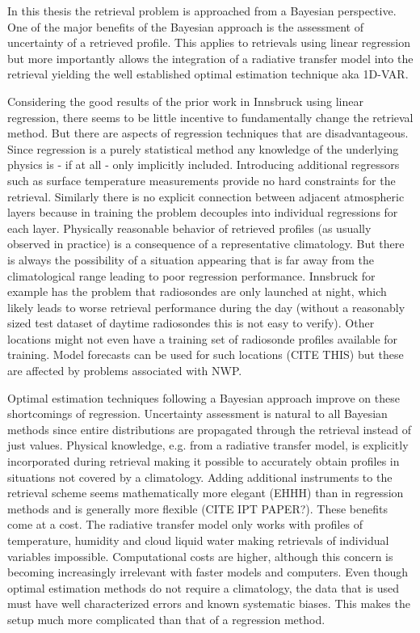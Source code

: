 \stopsection


\startsection[title={Objectives and Outline}]

    In this thesis the retrieval problem is approached from a Bayesian
    perspective. One of the major benefits of the Bayesian approach is the
    assessment of uncertainty of a retrieved profile. This applies to
    retrievals using linear regression but more importantly allows the
    integration of a radiative transfer model into the retrieval yielding
    the well established optimal estimation technique aka 1D-VAR.

    Considering the good results of the prior work in Innsbruck using linear
    regression, there seems to be little incentive to fundamentally change the
    retrieval method. But there are aspects of regression techniques that are
    disadvantageous. Since regression is a purely statistical method any
    knowledge of the underlying physics is - if at all - only implicitly
    included. Introducing additional regressors such as surface temperature
    measurements provide no hard constraints for the retrieval. Similarly
    there is no explicit connection between adjacent atmospheric layers because
    in training the problem decouples into individual regressions for each
    layer. Physically reasonable behavior of retrieved profiles (as usually
    observed in practice) is a consequence of a representative climatology.
    But there is always the possibility of a situation appearing that is far
    away from the climatological range leading to poor regression performance.
    Innsbruck for example has the problem that radiosondes are only launched at
    night, which likely leads to worse retrieval performance during the day
    (without a reasonably sized test dataset of daytime radiosondes this is not
    easy to verify).  Other locations might not even have a training set of
    radiosonde profiles available for training. Model forecasts can be used for
    such locations (CITE THIS) but these are affected by problems associated
    with NWP.

    Optimal estimation techniques following a Bayesian approach improve on
    these shortcomings of regression. Uncertainty assessment is natural to all
    Bayesian methods since entire distributions are propagated through the
    retrieval instead of just values. Physical knowledge, e.g. from a radiative
    transfer model, is explicitly incorporated during retrieval making it
    possible to accurately obtain profiles in situations not covered by
    a climatology. Adding additional instruments to the retrieval scheme seems
    mathematically more elegant (EHHH) than in regression methods and is
    generally more flexible (CITE IPT PAPER?). These benefits come at a cost.
    The radiative transfer model only works with profiles of temperature,
    humidity and cloud liquid water making retrievals of individual variables
    impossible. Computational costs are higher, although this concern is
    becoming increasingly irrelevant with faster models and computers. Even
    though optimal estimation methods do not require a climatology, the data
    that is used must have well characterized errors and known systematic
    biases. This makes the setup much more complicated than that of
    a regression method.


